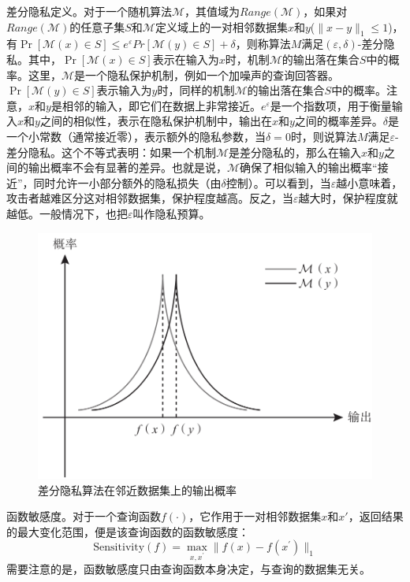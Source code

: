 差分隐私定义。对于一个随机算法$\mathcal{M}$，其值域为$Range(\mathcal{M})$，如果对$Range(\mathcal{M})$的任意子集$S$和$\mathcal{M}$定义域上的一对相邻数据集$x$和$y$($\parallel x - y \parallel_1 \le 1$)，有$\Pr[\mathcal{M}(x)\in S]\leq e^{\varepsilon}Pr[\mathcal{M}(y)\in S]+\delta$，则称算法$M$满足$(\varepsilon ,\delta)$-差分隐私。其中，$\Pr[\mathcal{M}(x)\in S]$表示在输入为$x$时，机制$\mathcal{M}$的输出落在集合$S$中的概率。这里，$\mathcal{M}$是一个隐私保护机制，例如一个加噪声的查询回答器。$\Pr[\mathcal{M}(y)\in S]$表示输入为$y$时，同样的机制$\mathcal{M}$的输出落在集合$S$中的概率。注意，$x$和$y$是相邻的输入，即它们在数据上非常接近。$e^{\varepsilon}$是一个指数项，用于衡量输入$x$和$y$之间的相似性，表示在隐私保护机制中，输出在$x$和$y$之间的概率差异。$\delta$是一个小常数（通常接近零），表示额外的隐私参数，当$\delta=0$时，则说算法$M$满足$\varepsilon $-差分隐私。这个不等式表明：如果一个机制$\mathcal{M}$是差分隐私的，那么在输入$x$和$y$之间的输出概率不会有显著的差异。也就是说，$\mathcal{M}$确保了相似输入的输出概率“接近”，同时允许一小部分额外的隐私损失（由$\delta$控制）。可以看到，当$\varepsilon $越小意味着，攻击者越难区分这对相邻数据集，保护程度越高。反之，当$\varepsilon $越大时，保护程度就越低。一般情况下，也把$\varepsilon $叫作隐私预算。

\begin{figure}[htb]
\centering
    \includegraphics[scale=1]{figures/chapter4/dp figure.png}
    \caption{差分隐私算法在邻近数据集上的输出概率}
    \label{fig:dp figure}
\end{figure}

函数敏感度。对于一个查询函数$f(·)$，它作用于一对相邻数据集$x$和$x′$，返回结果的最大变化范围，便是该查询函数的函数敏感度：
\begin{equation}\mathrm{Sensitivity}(f)=\max_{x,x^{\prime}}\parallel f(x)-f(x^{\prime})\parallel_{1}
\end{equation}
需要注意的是，函数敏感度只由查询函数本身决定，与查询的数据集无关。

